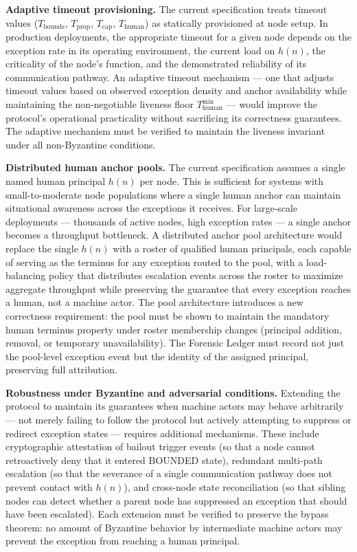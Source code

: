 \medskip\noindent\textbf{Adaptive timeout provisioning.}%
\label{sec:future:adaptive}
The current specification treats timeout values ($T_{\mathrm{bounds}}$, $T_{\mathrm{prop}}$, $T_{\mathrm{cap}}$, $T_{\mathrm{human}}$) as statically provisioned at node setup. In production deployments, the appropriate timeout for a given node depends on the exception rate in its operating environment, the current load on $h(n)$, the criticality of the node's function, and the demonstrated reliability of its communication pathway. An adaptive timeout mechanism — one that adjusts timeout values based on observed exception density and anchor availability while maintaining the non-negotiable liveness floor $T_{\mathrm{human}}^{\min}$ — would improve the protocol's operational practicality without sacrificing its correctness guarantees. The adaptive mechanism must be verified to maintain the liveness invariant under all non-Byzantine conditions.

\medskip\noindent\textbf{Distributed human anchor pools.}%
\label{sec:future:pools}
The current specification assumes a single named human principal $h(n)$ per node. This is sufficient for systems with small-to-moderate node populations where a single human anchor can maintain situational awareness across the exceptions it receives. For large-scale deployments — thousands of active nodes, high exception rates — a single anchor becomes a throughput bottleneck. A distributed anchor pool architecture would replace the single $h(n)$ with a roster of qualified human principals, each capable of serving as the terminus for any exception routed to the pool, with a load-balancing policy that distributes escalation events across the roster to maximize aggregate throughput while preserving the guarantee that every exception reaches a human, not a machine actor. The pool architecture introduces a new correctness requirement: the pool must be shown to maintain the mandatory human terminus property under roster membership changes (principal addition, removal, or temporary unavailability). The Forensic Ledger must record not just the pool-level exception event but the identity of the assigned principal, preserving full attribution.

\medskip\noindent\textbf{Robustness under Byzantine and adversarial conditions.}%
\label{sec:future:byzantine}
Extending the protocol to maintain its guarantees when machine actors may behave arbitrarily — not merely failing to follow the protocol but actively attempting to suppress or redirect exception states — requires additional mechanisms. These include cryptographic attestation of bailout trigger events (so that a node cannot retroactively deny that it entered BOUNDED state), redundant multi-path escalation (so that the severance of a single communication pathway does not prevent contact with $h(n)$), and cross-node state reconciliation (so that sibling nodes can detect whether a parent node has suppressed an exception that should have been escalated). Each extension must be verified to preserve the bypass theorem: no amount of Byzantine behavior by intermediate machine actors may prevent the exception from reaching a human principal.

